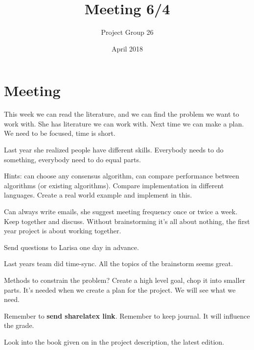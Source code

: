 \documentclass{article}
\title{Meeting 6/4}
\author{Project Group 26}
\date{April 2018}
\begin{document}
\maketitle

\section{Meeting}


This week  we can read the literature, and we can find the problem we want to work with. She has literature we can work with. Next time we can make a plan. We need to be focused, time is short. 

Last year she realized people have different skills. Everybody needs to do something, everybody need to do equal parts.

Hints: can choose any consensus algorithm, can compare performance between algorithms (or existing algorithms). Compare implementation in different languages. Create a real world example and implement in this.

Can always write emails, she suggest meeting frequency once or twice a week. Keep together and discuss. Without brainstorming it's all about nothing, the first year project is about working together. 

Send questions to Larisa one day in advance. 

Last years team did time-sync. All the topics of the brainstorm seems great. 

Methods to constrain the problem? Create a high level goal, chop it into smaller parts. It's needed when we create a plan for the project. We will see what we need.

Remember to \textbf{send sharelatex link}. Remember to keep journal. It will influence the grade.

Look into the book given on in the project description, the latest edition.
\end{document}
